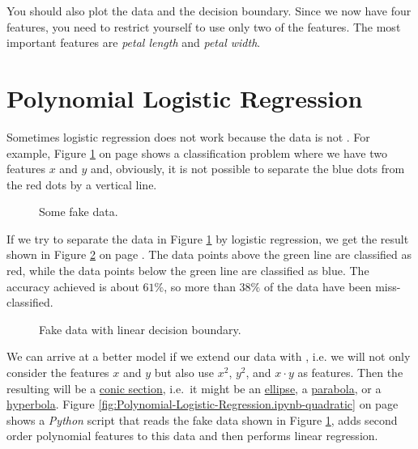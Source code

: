 You should also plot the data and the decision boundary.  Since we now have four features, you need to restrict
yourself to use only two of the features.  The most important features are \emph{petal length} and \emph{petal width}.

\eox

\section{Polynomial Logistic Regression}
Sometimes logistic regression does not work because the data is not .  For example,
Figure \ref{fig:fake-data.pdf} on page \pageref{fig:fake-data.pdf} shows a classification problem where we have
two features $x$ and $y$ and, obviously, it is not possible to separate the blue dots from the red dots by a
vertical line.

\begin{figure}[!th]
\caption{Some fake data.}
\label{fig:fake-data.pdf}
\end{figure}

If we try to separate the data in Figure \ref{fig:fake-data.pdf} by logistic regression, we get the result
shown in Figure \ref{fig:fake-data-line.pdf} on page \pageref{fig:fake-data-line.pdf}.  The data points above
the green line are classified as red, while the data points below the green line are classified as blue.  The
accuracy achieved is about $61\%$, so more than $38\%$ of the data have been miss-classified.

\begin{figure}[!th]
\caption{Fake data with linear decision boundary.}
\label{fig:fake-data-line.pdf}
\end{figure}

We can arrive at a better model if we extend our data with , i.e. we will not only
consider the features $x$ and $y$ but also use $x^2$, $y^2$, and $x \cdot y$ as features.  Then the resulting
 will be a \href{https://en.wikipedia.org/wiki/Conic_section}{conic section}, i.e.~it
might be an \href{https://en.wikipedia.org/wiki/Ellipse}{ellipse}, a
\href{https://en.wikipedia.org/wiki/Parabola}{parabola}, or a
\href{https://en.wikipedia.org/wiki/Hyperbola}{hyperbola}. 
Figure \ref{fig:Polynomial-Logistic-Regression.ipynb-quadratic} on page
\pageref{fig:Polynomial-Logistic-Regression.ipynb-quadratic} shows a \textsl{Python} script that reads the fake
data shown in Figure \ref{fig:fake-data.pdf}, adds second order polynomial features to this data and then
performs linear regression.


